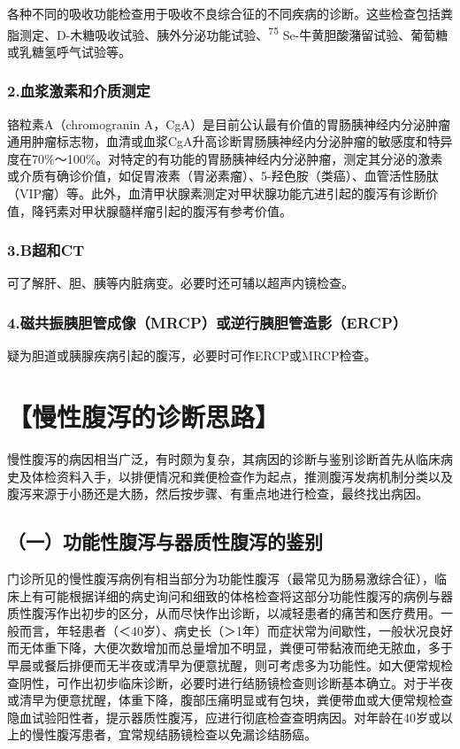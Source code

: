各种不同的吸收功能检查用于吸收不良综合征的不同疾病的诊断。这些检查包括粪脂测定、D-木糖吸收试验、胰外分泌功能试验、\textsuperscript{75}
Se-牛黄胆酸潴留试验、葡萄糖或乳糖氢呼气试验等。

\subsubsection{2.血浆激素和介质测定}

铬粒素A（chromogranin
A，CgA）是目前公认最有价值的胃肠胰神经内分泌肿瘤通用肿瘤标志物，血清或血浆CgA升高诊断胃肠胰神经内分泌肿瘤的敏感度和特异度在70\%～100\%。对特定的有功能的胃肠胰神经内分泌肿瘤，测定其分泌的激素或介质有确诊价值，如促胃液素（胃泌素瘤）、5-羟色胺（类癌）、血管活性肠肽（VIP瘤）等。此外，血清甲状腺素测定对甲状腺功能亢进引起的腹泻有诊断价值，降钙素对甲状腺髓样瘤引起的腹泻有参考价值。

\subsubsection{3.B超和CT}

可了解肝、胆、胰等内脏病变。必要时还可辅以超声内镜检查。

\subsubsection{4.磁共振胰胆管成像（MRCP）或逆行胰胆管造影（ERCP）}

疑为胆道或胰腺疾病引起的腹泻，必要时可作ERCP或MRCP检查。

\section{【慢性腹泻的诊断思路】}

慢性腹泻的病因相当广泛，有时颇为复杂，其病因的诊断与鉴别诊断首先从临床病史及体检资料入手，以排便情况和粪便检查作为起点，推测腹泻发病机制分类以及腹泻来源于小肠还是大肠，然后按步骤、有重点地进行检查，最终找出病因。

\subsection{（一）功能性腹泻与器质性腹泻的鉴别}

门诊所见的慢性腹泻病例有相当部分为功能性腹泻（最常见为肠易激综合征），临床上有可能根据详细的病史询问和细致的体格检查将这部分功能性腹泻的病例与器质性腹泻作出初步的区分，从而尽快作出诊断，以减轻患者的痛苦和医疗费用。一般而言，年轻患者（＜40岁）、病史长（＞1年）而症状常为间歇性，一般状况良好而无体重下降，大便次数增加而总量增加不明显，粪便可带黏液而绝无脓血，多于早晨或餐后排便而无半夜或清早为便意扰醒，则可考虑多为功能性。如大便常规检查阴性，可作出初步临床诊断，必要时进行结肠镜检查则诊断基本确立。对于半夜或清早为便意扰醒，体重下降，腹部压痛明显或有包块，粪便带血或大便常规检查隐血试验阳性者，提示器质性腹泻，应进行彻底检查查明病因。对年龄在40岁或以上的慢性腹泻患者，宜常规结肠镜检查以免漏诊结肠癌。

